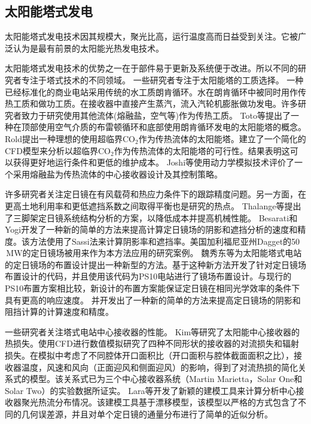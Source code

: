\subsection{太阳能塔式发电}
\label{sec:st}

太阳能塔式发电技术因其规模大，聚光比高，运行温度高而日益受到关注。它被广泛认为是最有前景的太阳能光热发电技术。

太阳能塔式发电技术的优势之一在于部件易于更新及系统便于改进。所以不同的研究者专注于塔式技术的不同领域。
一些研究者专注于太阳能塔的工质选择。
一种已经标准化的商业电站采用传统的水工质朗肯循环\cite{Spiros2017}。水在朗肯循环中被同时用作传热工质和做功工质。在接收器中直接产生蒸汽，流入汽轮机膨胀做功发电\cite{Montes2009,Feldhoff2012,Steinmann2006,Yu2017,Gonzalez2017}。许多研究者致力于研究使用其他流体(熔融盐，空气等)作为传热工质。
Toto等\cite{Toro2016}提出了一种在顶部使用空气介质的布雷顿循环和底部使用朗肯循环发电的太阳能塔的概念。
Rold\cite{Rold2016}提出一种理想的使用超临界CO$_2$作为传热流体的太阳能塔。建立了一个简化的CFD模型来分析以超临界CO$_2$作为传热流体的太阳能塔的可行性。结果表明这可以获得更好地运行条件和更低的维护成本。
Joshi等\cite{Joshi2016}使用动力学模拟技术评价了一个采用熔融盐为传热流体的中心接收器设计及其控制策略。

许多研究者关注定日镜在有风载荷和热应力条件下的跟踪精度问题。另一方面，在更高土地利用率和更低遮挡系数之间取得平衡也是研究的热点。
Thalange等\cite{Thalange2017}提出了三脚架定日镜系统结构分析的方案，以降低成本并提高机械性能。
Besarati和Yogi\cite{Besarati2014}开发了一种新的简单的方法来提高计算定日镜场的阴影和遮挡分析的速度和精度。该方法使用了Sassi法\cite{Sassi1983}来计算阴影率和遮挡率。美国加利福尼亚州Dagget的50$\,\mathrm{MW}$的定日镜场被用来作为本方法应用的研究案例。
魏秀东等\cite{Wei2010}为太阳能塔式电站的定日镜场的布置设计提出一种新型的方法。基于这种新方法开发了针对定日镜场布置设计的代码，并且使用该代码为PS10电站进行了镜场布置设计。与现行的PS10布置方案相比较，新设计的布置方案能保证定日镜在相同光学效率的条件下具有更高的响应速度。
并开发出了一种新的简单的方法来提高定日镜场的阴影和阻挡计算的计算速度和精度。 

一些研究者关注塔式电站中心接收器的性能。
Kim等\cite{Kim2015}研究了太阳能中心接收器的热损失。使用CFD进行数值模拟研究了四种不同形状的接收器的对流损失和辐射损失。在模拟中考虑了不同腔体开口面积比（开口面积与腔体截面面积之比），接收器温度，风速和风向（正面迎风和侧面迎风）的影响，得到了对流热损的简化关系式的模型。该关系式已为三个中心接收器系统（Martin Marietta，Solar One和Solar Two）的实验数据所证实。
Lara等\cite{Lara2016}开发了新颖的建模工具来计算分析中心接收器聚光热流分布情况。该建模工具基于漂移模型，该模型以严格的方式包含了不同的几何误差源，并且对单个定日镜的通量分布进行了简单的近似分析。

